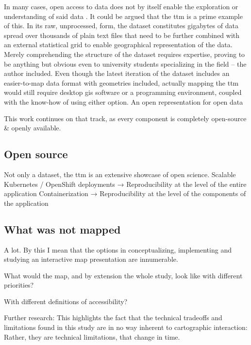 In many cases, open access to data does not by itself enable
the exploration or understanding of said data \parencite{obr2016}.
It could be argued that the \acrshort{ttm} is a prime example of this.
In its raw, unprocessed, form,
the dataset constitutes gigabytes of data spread over thousands of plain text files
that need to be further combined with an external statistical grid to enable
geographical representation of the data.
Merely comprehending the structure of the dataset requires expertise,
proving to be anything but obvious even to university students specializing in the field
-- the author included.
Even though the latest iteration of the dataset \parencite{fin2023}
includes an easier-to-map data format with geometries included,
actually mapping the \acrshort{ttm} would still require
desktop \acrshort{gis} software or a programming environment,
coupled with the know-how of using either option.
An open representation for open data

This work continues on that track,
as every component is completely open-source \& openly available.

\subsection{Open source}
Not only a dataset, the \acrshort{ttm} is an extensive showcase of open science.
Scalable Kubernetes / OpenShift deployments → Reproducibility at the level of the entire application
Containerization → Reproducibility at the level of the components of the application

\subsection{What was not mapped}

A lot. By this I mean that the options in
conceptualizing, implementing and studying an interactive map presentation are innumerable.

What would the map, and by extension the whole study, look like with different priorities?

With different definitions of accessibility?

Further research:
This highlights the fact that the technical tradeoffs and limitations found in this study
are in no way inherent to cartographic interaction:
Rather, they are technical limitations, that change in time.
